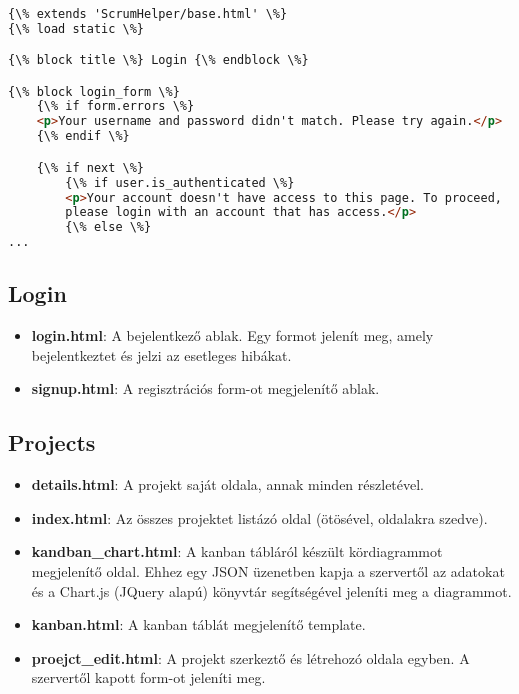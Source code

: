 \pagebreak

\begin{lstlisting}[language={html}]

{\% extends 'ScrumHelper/base.html' \%}
{\% load static \%}

{\% block title \%} Login {\% endblock \%}

{\% block login_form \%}
    {\% if form.errors \%}
    <p>Your username and password didn't match. Please try again.</p>
    {\% endif \%}

    {\% if next \%}
        {\% if user.is_authenticated \%}
        <p>Your account doesn't have access to this page. To proceed,
        please login with an account that has access.</p>
        {\% else \%}
...
\end{lstlisting}


\subsection{Login}
\begin{itemize}
	\item \textbf{login.html}: A bejelentkező ablak. Egy formot jelenít meg, amely bejelentkeztet és jelzi az esetleges hibákat.
	\item \textbf{signup.html}: A regisztrációs form-ot megjelenítő ablak.
\end{itemize}
\subsection{Projects}
\begin{itemize}
	\item \textbf{details.html}: A projekt saját oldala, annak minden részletével.
	\item \textbf{index.html}: Az összes projektet listázó oldal (ötösével, oldalakra szedve).
	\item \textbf{kandban\_chart.html}: A kanban tábláról készült kördiagrammot megjelenítő oldal. Ehhez egy JSON üzenetben kapja a szervertől az adatokat és a Chart.js (JQuery alapú) könyvtár segítségével jeleníti meg a diagrammot.
	\item \textbf{kanban.html}: A kanban táblát megjelenítő template.
	\item \textbf{proejct\_edit.html}: A projekt szerkeztő és létrehozó oldala egyben. A szervertől kapott form-ot jeleníti meg.
\end{itemize}
